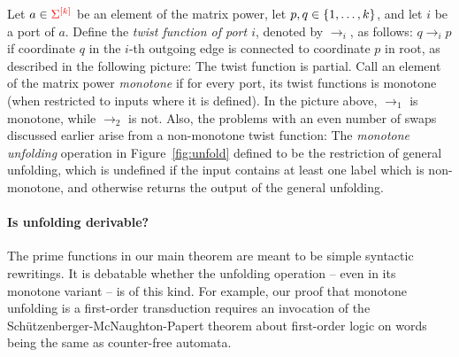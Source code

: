  Let  $a \in {\color{red}{\Sigma}}^{{\color{red}{[k]}}}$ be an element of the matrix power,  let $p,q \in \{1,\ldots,k\}$, and let  $i$ be a port of $a$. Define the \emph{twist function of port $i$}, denoted by $\to_i$, as follows:
     $q \to_i p$ 
if coordinate $q$ in the $i$-th outgoing edge  is connected to  coordinate $p$ in root, as described in the following picture:
The twist function is partial. Call  an element of the matrix power  \emph{monotone} if for every port, its twist functions is monotone (when restricted to inputs where it is defined). In the picture above, $\to_1$ is monotone, while $\to_2$ is not. Also, the problems with an even number of swaps discussed earlier arise from  a non-monotone twist function:
The \emph{monotone unfolding} operation in Figure~\ref{fig:unfold} defined to be the restriction of general unfolding,  which  is undefined if the input contains at least one label which is non-monotone, and otherwise returns the output of the general unfolding.

\paragraph*{Is unfolding derivable?} The  prime functions in our main theorem  are meant to be simple syntactic rewritings. It is debatable whether the  unfolding operation -- even in its monotone variant -- is of this kind. For example, our proof  that monotone unfolding is a first-order transduction requires an invocation of the Sch\"utzenberger-McNaughton-Papert theorem about first-order logic on words being the same as counter-free automata. 

